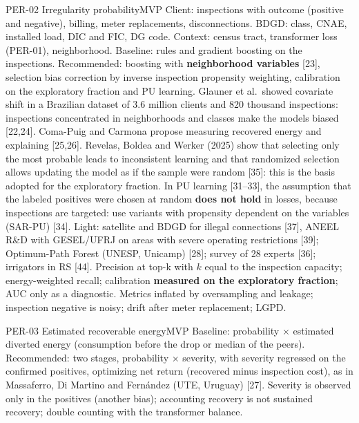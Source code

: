 \begin{ficha}{PER-02 \textperiodcentered{} Irregularity probability}{MVP}
 Client: inspections with outcome (positive and negative),
billing, meter replacements, disconnections. BDGD: class, CNAE, installed load,
DIC and FIC, DG code. Context: census tract, transformer loss
(PER-01), neighborhood.
 Baseline: rules and gradient boosting on the
inspections. Recommended: boosting with \textbf{neighborhood variables} [23],
selection bias correction by inverse inspection propensity weighting,
calibration on the exploratory fraction and PU learning.
 Glauner et al.\ showed covariate shift in a
Brazilian dataset of 3.6 million clients and 820 thousand inspections: inspections
concentrated in neighborhoods and classes make the models biased [22,24].
Coma-Puig and Carmona propose measuring recovered energy and explaining [25,26].
Revelas, Boldea and Werker (2025) show that selecting only the most probable
leads to inconsistent learning and that randomized selection allows
updating the model as if the sample were random [35]: this is the basis
adopted for the exploratory fraction. In PU learning [31--33], the assumption that the
labeled positives were chosen at random \textbf{does not hold} in losses,
because inspections are targeted: use variants with propensity dependent
on the variables (SAR-PU) [34].
 Light: satellite and BDGD for illegal connections
[37], ANEEL R\&D with GESEL/UFRJ on areas with severe operating
restrictions [39]; Optimum-Path Forest (UNESP, Unicamp) [28]; survey of
28 experts [36]; irrigators in RS [44].
 Precision at top-k with $k$ equal to the inspection capacity;
energy-weighted recall; calibration \textbf{measured on the exploratory
fraction}; AUC only as a diagnostic.
 Metrics inflated by oversampling and leakage; inspection
negative is noisy; drift after meter replacement; LGPD.
\end{ficha}

\begin{ficha}{PER-03 \textperiodcentered{} Estimated recoverable energy}{MVP}
 Baseline: probability × estimated diverted energy
(consumption before the drop or median of the peers). Recommended: two stages,
probability × severity, with severity regressed on the confirmed
positives, optimizing net return (recovered minus inspection
cost), as in Massaferro, Di Martino and Fernández (UTE, Uruguay) [27].
 Severity is observed only in the positives (another bias);
accounting recovery is not sustained recovery; double counting with the
transformer balance.
\end{ficha}

